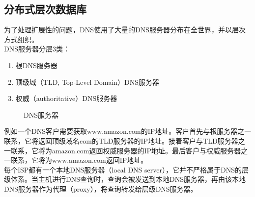 \vspace{0.5cm}

\subsection{分布式层次数据库}

为了处理扩展性的问题，DNS使用了大量的DNS服务器分布在全世界，并以层次方式组织。\\

DNS服务器分层3类：

\begin{enumerate}
    \item 根DNS服务器
    \item 顶级域（TLD, Top-Level Domain）DNS服务器
    \item 权威（authoritative）DNS服务器
\end{enumerate}

\begin{figure}[H]
    \centering
    \caption{DNS服务器}
\end{figure}

\vspace{0.5cm}

例如一个DNS客户需要获取www.amazon.com的IP地址。客户首先与根服务器之一联系，它将返回顶级域名com的TLD服务器的IP地址。接着客户与TLD服务器之一联系，它将为amazon.com返回权威服务器的IP地址。最后客户与权威服务器之一联系，它将为www.amazon.com返回IP地址。\\

每个ISP都有一个本地DNS服务器（local DNS server），它并不严格属于DNS的层级体系。当主机进行DNS查询时，查询会被发送到本地DNS服务器，再由该本地DNS服务器作为代理（proxy），将查询转发给层级DNS服务器。\\

